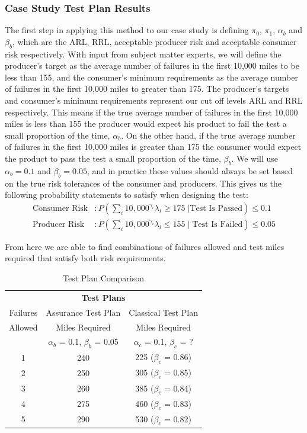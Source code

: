 \documentclass[12pt]{article}
\begin{document}
\subsubsection{Case Study Test Plan Results}
The first step in applying this method to our case study is defining $\pi_0$,
$\pi_1$, $\alpha_b$ and $\beta_b$, which are the ARL, RRL, acceptable producer risk
and acceptable consumer risk respectively.  With input from subject matter
experts,  we will define the producer's target as the average number of
failures in the first 10,000 miles to be less than 155, and the consumer's minimum
requirements as the average number of failures in the first 10,000 miles to
greater than 175. The producer's targets and consumer's minimum requirements represent our cut off levels ARL and RRL respectively.  This means if the true average number of failures in the first 10,000 miles is less than 155 the producer would expect his product to fail the test a small proportion of the time, $\alpha_b$.  On the other hand, if the true average number of failures in the first 10,000 miles is greater than 175 the consumer would expect the product to pass the test a small proportion of the time, $\beta_b$. We will use $\alpha_b = 0.1$ and $\beta_b = 0.05$, and in practice these values should always be set based on
the true risk tolerances of the consumer and producers.  This gives us the
following probability statements to satisfy when designing the test:
\\
$$
\begin{aligned}
  \text{Consumer Risk} &: P(\sum_i 10,000^{\gamma_i} \lambda_i \geq 175 \; \vert \text{Test Is Passed}) \leq 0.1  \\
  \text{Producer Risk} &: P(\sum_i 10,000^{\gamma_i} \lambda_i \leq 155 \; \vert \; \text{Test Is Failed}) \leq 0.05
\end{aligned}
$$

From here we are able to find combinations of failures allowed and test miles
required that satisfy both risk requirements.

\begin{table}[h]
\center
\begin{tabular}{|c|c|c|}
\multicolumn{3}{c}{\textbf{Test Plans}} \\
\cline{1-3}
Failures & Assurance Test Plan & Classical Test Plan \\
Allowed & Miles Required & Miles Required \\
  & $\alpha_b$ = 0.1, $\beta_b$ = 0.05 & $\alpha_c$ = 0.1, $\beta_c$ = ? \\
\hline
1   & 240 & 225  ($\beta_c$ = 0.86) \\
2   & 250 & 305  ($\beta_c$ = 0.85) \\
3   & 260 & 385  ($\beta_c$ = 0.84) \\
4   & 275 & 460  ($\beta_c$ = 0.83) \\
5   & 290 & 530  ($\beta_c$ = 0.82) \\
\hline
\end{tabular}
\caption{Test Plan Comparison}
\label{table:ta}
\end{table}
\end{document}
